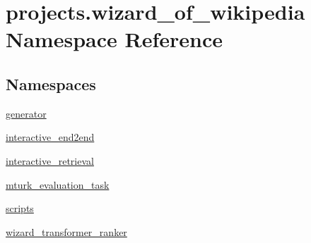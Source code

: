 \hypertarget{namespaceprojects_1_1wizard__of__wikipedia}{}\section{projects.\+wizard\+\_\+of\+\_\+wikipedia Namespace Reference}
\label{namespaceprojects_1_1wizard__of__wikipedia}
\subsection*{Namespaces}
\begin{DoxyCompactItemize}
\item 
 \hyperlink{namespaceprojects_1_1wizard__of__wikipedia_1_1generator}{generator}
\item 
 \hyperlink{namespaceprojects_1_1wizard__of__wikipedia_1_1interactive__end2end}{interactive\+\_\+end2end}
\item 
 \hyperlink{namespaceprojects_1_1wizard__of__wikipedia_1_1interactive__retrieval}{interactive\+\_\+retrieval}
\item 
 \hyperlink{namespaceprojects_1_1wizard__of__wikipedia_1_1mturk__evaluation__task}{mturk\+\_\+evaluation\+\_\+task}
\item 
 \hyperlink{namespaceprojects_1_1wizard__of__wikipedia_1_1scripts}{scripts}
\item 
 \hyperlink{namespaceprojects_1_1wizard__of__wikipedia_1_1wizard__transformer__ranker}{wizard\+\_\+transformer\+\_\+ranker}
\end{DoxyCompactItemize}
